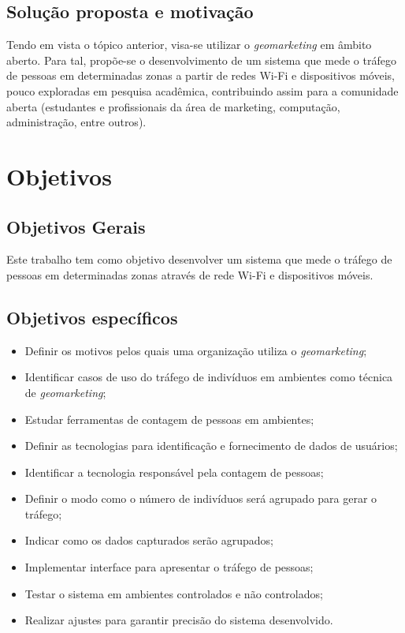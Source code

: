 \subsection{Solução proposta e motivação}
Tendo em vista o tópico anterior, visa-se utilizar o \emph{geomarketing} em 
âmbito aberto. Para tal, propõe-se o desenvolvimento de um sistema que mede o
tráfego de pessoas em determinadas zonas a partir de redes Wi-Fi e dispositivos móveis, pouco exploradas em
pesquisa acadêmica, contribuindo assim para a comunidade aberta (estudantes e profissionais da área de
marketing, computação, administração, entre outros).

\section{Objetivos}
\label{objetivos}

\subsection{Objetivos Gerais}
Este trabalho tem como objetivo desenvolver um sistema que mede o tráfego de
pessoas em determinadas zonas através de rede Wi-Fi e dispositivos móveis.

\subsection{Objetivos específicos}
\begin{itemize}
  \item Definir os motivos pelos quais uma organização utiliza o \emph{geomarketing};
  \item Identificar casos de uso do tráfego de indivíduos em ambientes como técnica
  de \emph{geomarketing};
  \item Estudar ferramentas de contagem de pessoas em ambientes;
  \item Definir as tecnologias para identificação e fornecimento de dados de usuários;
  \item Identificar a tecnologia responsável pela contagem de pessoas;
  \item Definir o modo como o número de indivíduos será agrupado para gerar o tráfego;
  \item Indicar como os dados capturados serão agrupados;
  \item Implementar interface para apresentar o tráfego de pessoas;
  \item Testar o sistema em ambientes controlados e não controlados;
  \item Realizar ajustes para garantir precisão do sistema desenvolvido.
\end{itemize}

